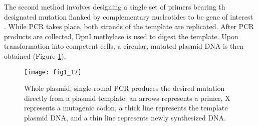 \begin{refsection}
The second method involves designing a single set of primers bearing th
designated mutation flanked by complementary nucleotides to be gene of interest
\cite{Arnold2003}. While PCR takes place, both strands of the template are
replicated. After PCR products are collected, DpnI methylase is used to
digest the template.  Upon transformation into competent cells, a circular,
mutated plasmid DNA is then obtained \cite{Antikainen2005a} (Figure
\ref{fig:sdm-2}).
\begin{figure}[htbp] \centering \texttt{[image: fig1\_17]}
    \caption[Whole plasmid, single-round PCR produces the desired mutation
    directly from a plasmid template: an arrows represents a primer, X
    represents a mutagenic codon, a thick line represents the template plasmid
    DNA, and a thin line represents newly synthesized DNA.]{Whole plasmid,
        single-round PCR produces the desired mutation directly from a plasmid
        template: an arrows represents a primer, X represents a mutagenic
        codon, a thick line represents the template plasmid DNA, and a thin
        line represents newly synthesized DNA\cite{Antikainen2005a}.}
        \label{fig:sdm-2}
\end{figure}


\end{refsection}
